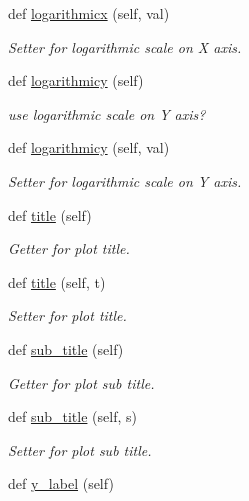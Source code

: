 \begin{DoxyCompactItemize}
def \hyperlink{classbridges_1_1line__chart_1_1_line_chart_a6feef7582874fb2338ff7fa7a469db5d}{logarithmicx} (self, val)
\begin{DoxyCompactList}\small\item\em Setter for logarithmic scale on X axis. \end{DoxyCompactList}\item 
def \hyperlink{classbridges_1_1line__chart_1_1_line_chart_a7ddc26feab771e7b36e9040ee38fab7f}{logarithmicy} (self)
\begin{DoxyCompactList}\small\item\em use logarithmic scale on Y axis? \end{DoxyCompactList}\item 
def \hyperlink{classbridges_1_1line__chart_1_1_line_chart_ac29eaedd760a3f608f7b11193befa1c5}{logarithmicy} (self, val)
\begin{DoxyCompactList}\small\item\em Setter for logarithmic scale on Y axis. \end{DoxyCompactList}\item 
def \hyperlink{classbridges_1_1line__chart_1_1_line_chart_ae9a4a1643095d0d0ac4d98e15adbeb3f}{title} (self)
\begin{DoxyCompactList}\small\item\em Getter for plot title. \end{DoxyCompactList}\item 
def \hyperlink{classbridges_1_1line__chart_1_1_line_chart_adbee0286b07ee001e0c762aa9c147946}{title} (self, t)
\begin{DoxyCompactList}\small\item\em Setter for plot title. \end{DoxyCompactList}\item 
def \hyperlink{classbridges_1_1line__chart_1_1_line_chart_a3361674c961f45bfa058cff38ba49bd8}{sub\+\_\+title} (self)
\begin{DoxyCompactList}\small\item\em Getter for plot sub title. \end{DoxyCompactList}\item 
def \hyperlink{classbridges_1_1line__chart_1_1_line_chart_ac26e0a4de0438a5463ba5dca95d2b0a3}{sub\+\_\+title} (self, s)
\begin{DoxyCompactList}\small\item\em Setter for plot sub title. \end{DoxyCompactList}\item 
def \hyperlink{classbridges_1_1line__chart_1_1_line_chart_a53234b2386393ec400bfbc969e8a5bf2}{y\+\_\+label} (self)

\end{DoxyCompactItemize}
